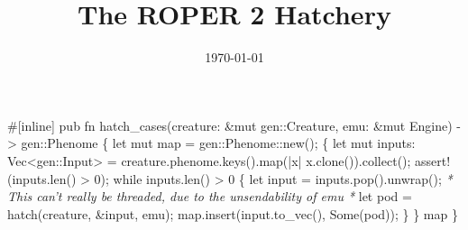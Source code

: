 \documentclass[11pt]{article}
\date{\today}
\title{The ROPER 2 Hatchery}
\begin{document}
\maketitle
\tableofcontents

\#[inline]
pub fn hatch\_cases(creature: \&mut gen::Creature, emu: \&mut Engine) 
                   -> gen::Phenome \{
    let mut map = gen::Phenome::new();
    \{
        let mut inputs: Vec<gen::Input> = 
            creature.phenome.keys().map(|x| x.clone()).collect();
        assert!(inputs.len() > 0);
        while inputs.len() > 0 \{
            let input = inputs.pop().unwrap();
            \emph{* This can't really be threaded, due to the unsendability of emu *}
            let pod = hatch(creature, \&input, emu);
            map.insert(input.to\_vec(), Some(pod));
        \}
    \}
    map
\}
\end{document}

